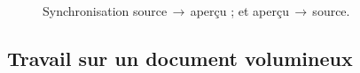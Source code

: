 \documentclass[11pt,french]{article}
\newcommand{\cmd}[1]{\textsf{#1}}
\newcommand{\To}{\,\(\to\)\,}
\begin{document}

\begin{figure}
\centering
{}%
\hfill%
%
\caption[Source/Preview Synch.]{
 Synchronisation source\To aperçu ; et
 aperçu\To source.}
\label{SourcePreviewSync}
\end{figure}

\subsection{Travail sur un document volumineux}\label{secroot}
\end{document}
